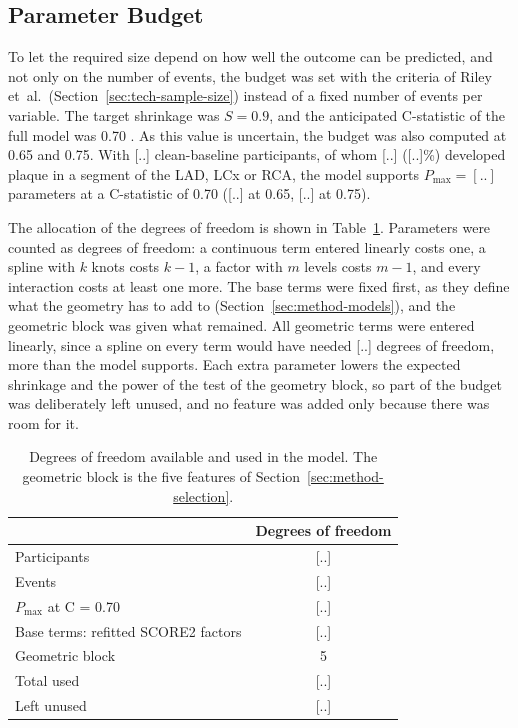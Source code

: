 \subsection{Parameter Budget}
\label{sec:method-size-budget}

To let the required size depend on how well the outcome can be predicted, and not only on the number of events, the budget was set with the criteria of Riley et~al.\ (Section~\ref{sec:tech-sample-size}) instead of a fixed number of events per variable.
The target shrinkage was $S = 0.9$, and the anticipated C-statistic of the full model was 0.70 .
As this value is uncertain, the budget was also computed at 0.65 and 0.75.
With [..] clean-baseline participants, of whom [..] ([..]\%) developed plaque in a segment of the LAD, LCx or RCA, the model supports $P_{\max} = [..]$ parameters at a C-statistic of 0.70 ([..] at 0.65, [..] at 0.75).

The allocation of the degrees of freedom is shown in Table~\ref{tab:method-size-budget}.
Parameters were counted as degrees of freedom: a continuous term entered linearly costs one, a spline with $k$ knots costs $k-1$, a factor with $m$ levels costs $m-1$, and every interaction costs at least one more.
The base terms were fixed first, as they define what the geometry has to add to (Section~\ref{sec:method-models}), and the geometric block was given what remained.
All geometric terms were entered linearly, since a spline on every term would have needed [..] degrees of freedom, more than the model supports.
Each extra parameter lowers the expected shrinkage and the power of the test of the geometry block, so part of the budget was deliberately left unused, and no feature was added only because there was room for it.

\begin{table}[htbp]
  \centering
  \caption{Degrees of freedom available and used in the model. The geometric block is the five features of Section~\ref{sec:method-selection}.}
  \label{tab:method-size-budget}
  \small
  \begin{tabular}{>{\raggedright\arraybackslash}p{6.4cm}c}
    \toprule
    & Degrees of freedom \\
    \midrule
    Participants & [..] \\
    Events & [..] \\
    $P_{\max}$ at C = 0.70 & [..] \\
    \midrule
    Base terms: refitted SCORE2 factors & [..] \\
    Geometric block & 5 \\
    \midrule
    Total used & [..] \\
    Left unused & [..] \\
    \bottomrule
  \end{tabular}
\end{table}


